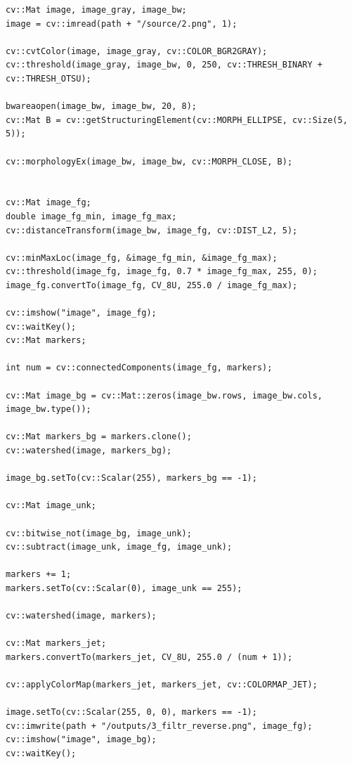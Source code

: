 \begin{lstlisting}[style=cpp_white, caption={Исходный код для сегментации изображения по водоразделам}]
cv::Mat image, image_gray, image_bw;
image = cv::imread(path + "/source/2.png", 1);

cv::cvtColor(image, image_gray, cv::COLOR_BGR2GRAY);
cv::threshold(image_gray, image_bw, 0, 250, cv::THRESH_BINARY + cv::THRESH_OTSU);

bwareaopen(image_bw, image_bw, 20, 8);
cv::Mat B = cv::getStructuringElement(cv::MORPH_ELLIPSE, cv::Size(5, 5));

cv::morphologyEx(image_bw, image_bw, cv::MORPH_CLOSE, B);


cv::Mat image_fg;
double image_fg_min, image_fg_max;
cv::distanceTransform(image_bw, image_fg, cv::DIST_L2, 5);

cv::minMaxLoc(image_fg, &image_fg_min, &image_fg_max);
cv::threshold(image_fg, image_fg, 0.7 * image_fg_max, 255, 0);
image_fg.convertTo(image_fg, CV_8U, 255.0 / image_fg_max);

cv::imshow("image", image_fg);
cv::waitKey();
cv::Mat markers;

int num = cv::connectedComponents(image_fg, markers);

cv::Mat image_bg = cv::Mat::zeros(image_bw.rows, image_bw.cols, image_bw.type());

cv::Mat markers_bg = markers.clone();
cv::watershed(image, markers_bg);

image_bg.setTo(cv::Scalar(255), markers_bg == -1);

cv::Mat image_unk;

cv::bitwise_not(image_bg, image_unk);
cv::subtract(image_unk, image_fg, image_unk);

markers += 1;
markers.setTo(cv::Scalar(0), image_unk == 255);

cv::watershed(image, markers);

cv::Mat markers_jet;
markers.convertTo(markers_jet, CV_8U, 255.0 / (num + 1));

cv::applyColorMap(markers_jet, markers_jet, cv::COLORMAP_JET);

image.setTo(cv::Scalar(255, 0, 0), markers == -1);
cv::imwrite(path + "/outputs/3_filtr_reverse.png", image_fg);
cv::imshow("image", image_bg);
cv::waitKey();
\end{lstlisting}

